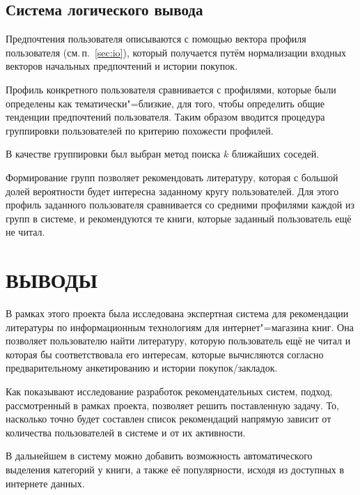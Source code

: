 \documentclass[simple,14pt,utf8,russian]{eskdtext}
\begin{document}
    \subsection{Система логического вывода}
    \label{sec:logic}
        Предпочтения пользователя описываются с помощью вектора профиля пользователя (см.\,п.~\ref{sec:io}), который
        получается путём нормализации входных векторов начальных предпочтений и истории покупок.

        Профиль конкретного пользователя сравнивается с профилями, которые были определены как тематически"=близкие,
        для того, чтобы определить общие тенденции предпочтений пользователя.
        Таким образом вводится процедура группировки пользователей по критерию похожести профилей.

        В качестве группировки был выбран метод поиска $k$ ближайших соседей.

        Формирование групп позволяет рекомендовать литературу, которая с большой долей вероятности будет интересна
        заданному кругу пользователей.
        Для этого профиль заданного пользователя сравнивается со средними профилями каждой из групп в системе, и
        рекомендуются те книги, которые заданный пользователь ещё не читал.
    \clearpage
\section*{ВЫВОДЫ}
    В рамках этого проекта была исследована экспертная система для рекомендации литературы по информационным
    технологиям для интернет"=магазина книг.
    Она позволяет пользователю найти литературу, которую пользователь ещё не читал и которая бы соответствовала его
    интересам, которые вычисляются согласно предварительному анкетированию и истории покупок/закладок.

    Как показывают исследование разработок рекомендательных систем, подход, рассмотренный в рамках проекта, позволяет
    решить поставленную задачу.
    То, насколько точно будет составлен список рекомендаций напрямую зависит от количества пользователей в системе и
    от их активности.

    В дальнейшем в систему можно добавить возможность автоматического выделения категорий у книги, а также её
    популярности, исходя из доступных в интернете данных.
    \clearpage



\clearpage
\end{document}
